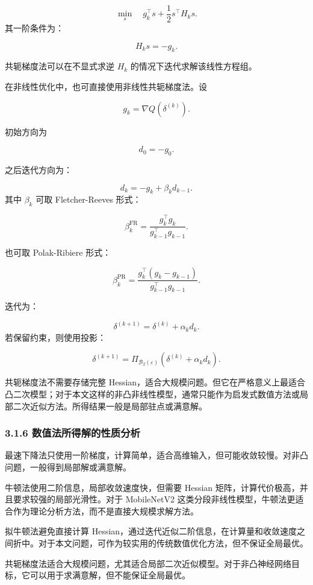 ﻿\documentclass[UTF8,zihao=-4,fontset=none]{ctexart}
\begin{document}
\[
\min_s
\quad
g_k^\top s+\frac12s^\top H_ks.
\]
\noindent 其一阶条件为：

\[
H_ks=-g_k.
\]

共轭梯度法可以在不显式求逆 \(H_k\) 的情况下迭代求解该线性方程组。

在非线性优化中，也可直接使用非线性共轭梯度法。设

\[
g_k=\nabla Q(\delta^{(k)}).
\]

初始方向为

\[
d_0=-g_0.
\]

之后迭代方向为：

\[
d_k=-g_k+\beta_kd_{k-1}.
\]
\noindent 其中 \(\beta_k\) 可取 Fletcher-Reeves 形式：

\[
\beta_k^{\mathrm{FR}}
=
\frac{g_k^\top g_k}{g_{k-1}^\top g_{k-1}}.
\]

也可取 Polak-Ribiere 形式：

\[
\beta_k^{\mathrm{PR}}
=
\frac{g_k^\top(g_k-g_{k-1})}{g_{k-1}^\top g_{k-1}}.
\]

迭代为：

\[
\delta^{(k+1)}
=
\delta^{(k)}+\alpha_kd_k.
\]
\noindent 若保留约束，则使用投影：

\[
\delta^{(k+1)}
=
\Pi_{\mathcal{B}_2(\varepsilon)}
\left(
\delta^{(k)}+\alpha_kd_k
\right).
\]

共轭梯度法不需要存储完整 Hessian，适合大规模问题。但它在严格意义上最适合凸二次模型；对于本文这样的非凸非线性模型，通常只能作为启发式数值方法或局部二次近似方法。所得结果一般是局部驻点或满意解。

\subsubsection*{3.1.6 数值法所得解的性质分析}
{}

最速下降法只使用一阶梯度，计算简单，适合高维输入，但可能收敛较慢。对非凸问题，一般得到局部解或满意解。

牛顿法使用二阶信息，局部收敛速度快，但需要 Hessian 矩阵，计算代价极高，并且要求较强的局部光滑性。对于 MobileNetV2 这类分段非线性模型，牛顿法更适合作为理论分析方法，而不是直接大规模求解方法。

拟牛顿法避免直接计算 Hessian，通过迭代近似二阶信息，在计算量和收敛速度之间折中。对于本文问题，可作为较实用的传统数值优化方法，但不保证全局最优。

共轭梯度法适合大规模问题，尤其适合局部二次近似模型。对于非凸神经网络目标，它可以用于求满意解，但不能保证全局最优。
\end{document}

